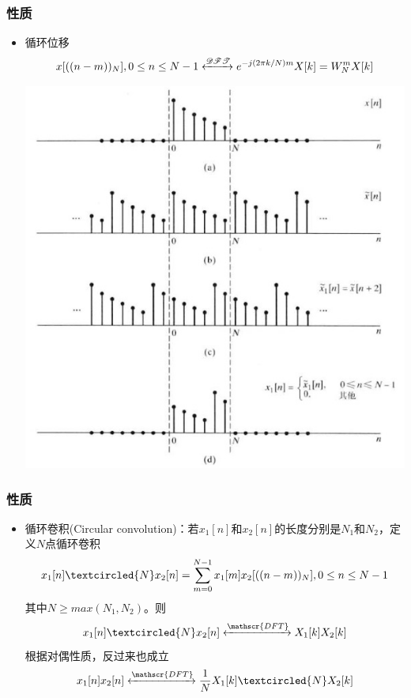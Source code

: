 \documentclass[CJKutf8,dvipsnames,table]{beamer}
\begin{document}
\begin{CJK*}{UTF8}{song}
  \begin{frame}
    \frametitle{性质}
    \begin{itemize}
    \item 循环位移
    \[
    	x[((n-m))_N], 0 \leq n \leq N-1 \xleftrightarrow{\mathscr{DFT}} e^{-j(2\pi k/N)m}X[k]=W_N^m X[k]
    \]
        \begin{center}
      \includegraphics[scale=.35]{dtsp-c-f8-12}
    \end{center}
	\end{itemize}
  \end{frame}        
      
  \begin{frame}
    \frametitle{性质}
    \begin{itemize}
    \item 循环卷积(Circular convolution)：若$x_1[n]$和$x_2[n]$的长度分别是$N_1$和$N_2$，定义$N$点循环卷积
    \[
    	x_1[n] \textcircled{N} x_2[n]=\sum_{m=0}^{N-1}x_1[m]x_2[((n-m))_N], 0 \leq n \leq N-1
    \]
    其中$N\geq max(N_1, N_2)$。则
    \[
		x_1[n] \textcircled{N} x_2[n] \xleftrightarrow{\mathscr{DFT}} X_1[k]X_2[k]
	\]    
	根据对偶性质，反过来也成立
	\[
		x_1[n]x_2[n] \xleftrightarrow{\mathscr{DFT}} \frac{1}{N} X_1[k] \textcircled{N} X_2[k]
	\] 
	\end{itemize}
  \end{frame}         
      

\end{CJK*}
\end{document}
